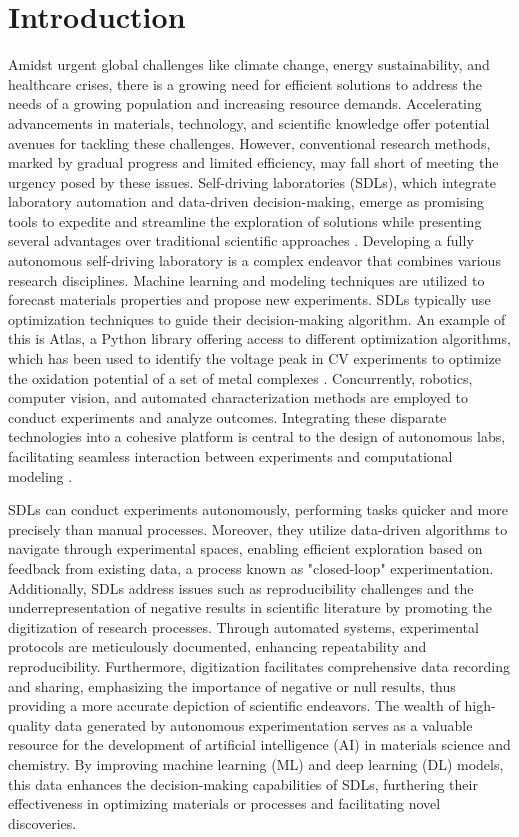 \chapter{Introduction} \label{introduction}
Amidst urgent global challenges like climate change, energy sustainability, and healthcare crises, there is a growing need for efficient solutions to address the needs of a growing population and increasing resource demands. Accelerating advancements in materials, technology, and scientific knowledge offer potential avenues for tackling these challenges. However, conventional research methods, marked by gradual progress and limited efficiency, may fall short of meeting the urgency posed by these issues. Self-driving laboratories (SDLs), which integrate laboratory automation and data-driven decision-making, emerge as promising tools to expedite and streamline the exploration of solutions while presenting several advantages over traditional scientific approaches \cite{Tom2024}. Developing a fully autonomous self-driving laboratory is a complex endeavor that combines various research disciplines. Machine learning and modeling techniques are utilized to forecast materials properties and propose new experiments. SDLs typically use optimization techniques to guide their decision-making algorithm. An example of this is Atlas, a Python library offering access to different optimization algorithms, which has been used to identify the voltage peak in CV experiments to optimize the oxidation potential of a set of metal complexes \cite{Hickman2023}. Concurrently, robotics, computer vision, and automated characterization methods are employed to conduct experiments and analyze outcomes.  Integrating these disparate technologies into a cohesive platform is central to the design of autonomous labs, facilitating seamless interaction between experiments and computational modeling \cite{StriethKalthoff2023}. 

SDLs can conduct experiments autonomously, performing tasks quicker and more precisely than manual processes. Moreover, they utilize data-driven algorithms to navigate through experimental spaces, enabling efficient exploration based on feedback from existing data, a process known as "closed-loop" experimentation. Additionally, SDLs address issues such as reproducibility challenges and the underrepresentation of negative results in scientific literature by promoting the digitization of research processes. Through automated systems, experimental protocols are meticulously documented, enhancing repeatability and reproducibility. Furthermore, digitization facilitates comprehensive data recording and sharing, emphasizing the importance of negative or null results, thus providing a more accurate depiction of scientific endeavors. The wealth of high-quality data generated by autonomous experimentation serves as a valuable resource for the development of artificial intelligence (AI) in materials science and chemistry. By improving machine learning (ML) and deep learning (DL) models, this data enhances the decision-making capabilities of SDLs, furthering their effectiveness in optimizing materials or processes and facilitating novel discoveries.

